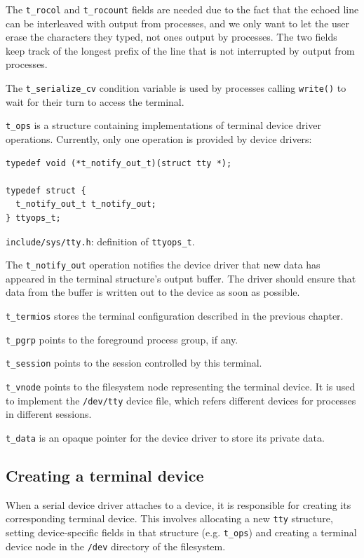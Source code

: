 \documentclass[shortabstract, manyadvisors, english, mgr]{iithesis}
\begin{document}
The \texttt{t\_rocol} and \texttt{t\_rocount} fields are needed due to the fact
that the echoed line can be interleaved with output from processes, and we only
want to let the user erase the characters they typed, not ones output by
processes. The two fields keep track of the longest prefix of the line that is
not interrupted by output from processes.

The \texttt{t\_serialize\_cv} condition variable is used by processes calling
\texttt{write()} to wait for their turn to access the terminal.

\texttt{t\_ops} is a structure containing implementations of terminal device
driver operations. Currently, only one operation is provided by device drivers:

\begin{listing}[H]
\begin{verbatim}
typedef void (*t_notify_out_t)(struct tty *);

typedef struct {
  t_notify_out_t t_notify_out;
} ttyops_t;
\end{verbatim}
\caption{\texttt{include/sys/tty.h}: definition of \texttt{ttyops\_t}.}
\end{listing}
The \texttt{t\_notify\_out} operation notifies the device driver that new data
has appeared in the terminal structure's output buffer. The driver should ensure
that data from the buffer is written out to the device as soon as possible.

\texttt{t\_termios} stores the terminal configuration described in the previous
chapter.

\texttt{t\_pgrp} points to the foreground process group, if any.

\texttt{t\_session} points to the session controlled by this terminal.

\texttt{t\_vnode} points to the filesystem node representing the terminal
device. It is used to implement the \texttt{/dev/tty} device file, which refers
different devices for processes in different sessions.

\texttt{t\_data} is an opaque pointer for the device driver to store its private
data.

\subsection{Creating a terminal device}

When a serial device driver attaches to a device, it is responsible for creating
its corresponding terminal device. This involves allocating a new \texttt{tty}
structure, setting device-specific fields in that structure (e.g.
\texttt{t\_ops}) and creating a terminal device node in the \texttt{/dev}
directory of the filesystem.
\end{document}
